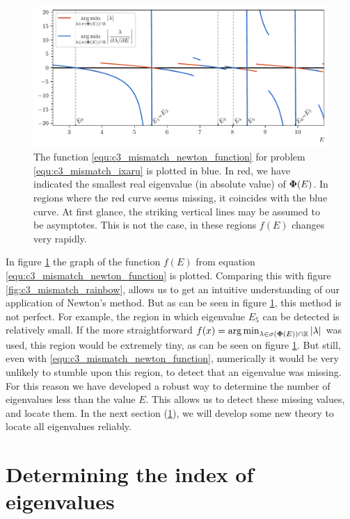 \begin{figure}
  \centering
  \includegraphics[width=\textwidth]{img/chapter3/mismatch_newton.pdf}
  \caption{The function \eqref{equ:c3_mismatch_newton_function} for problem \eqref{equ:c3_mismatch_ixaru} is plotted in blue. In red, we have indicated the smallest real eigenvalue (in absolute value) of $\vb{\Phi}(E)$. In regions where the red curve seems missing, it coincides with the blue curve. At first glance, the striking vertical lines may be assumed to be asymptotes. This is not the case, in these regions $f(E)$ changes very rapidly.}\label{fig:c3_mismatch_newton}
\end{figure}

In figure \ref{fig:c3_mismatch_newton} the graph of the function $f(E)$ from equation \eqref{equ:c3_mismatch_newton_function} is plotted. Comparing this with figure \ref{fig:c3_mismatch_rainbow}, allows us to get an intuitive understanding of our application of Newton's method. But as can be seen in figure \ref{fig:c3_mismatch_newton}, this method is not perfect. For example, the region in which eigenvalue $E_5$ can be detected is relatively small. If the more straightforward $f(x) = \operatorname*{arg\,min}_{\lambda \in \operatorname{\sigma}(\vb{\Phi}(E)) \cap \mathbb{R}} \left|\lambda\right|$ was used, this region would be extremely tiny, as can be seen on figure \ref{fig:c3_mismatch_newton}. But still, even with \eqref{equ:c3_mismatch_newton_function}, numerically it would be very unlikely to stumble upon this region, to detect that an eigenvalue was missing. For this reason we have developed a robust way to determine the number of eigenvalues less than the value $E$. This allows us to detect these missing values, and locate them. In the next section (\ref{sec:c3_index_of_e}), we will develop some new theory to locate all eigenvalues reliably.

\section{Determining the index of eigenvalues}\label{sec:c3_index_of_e}

